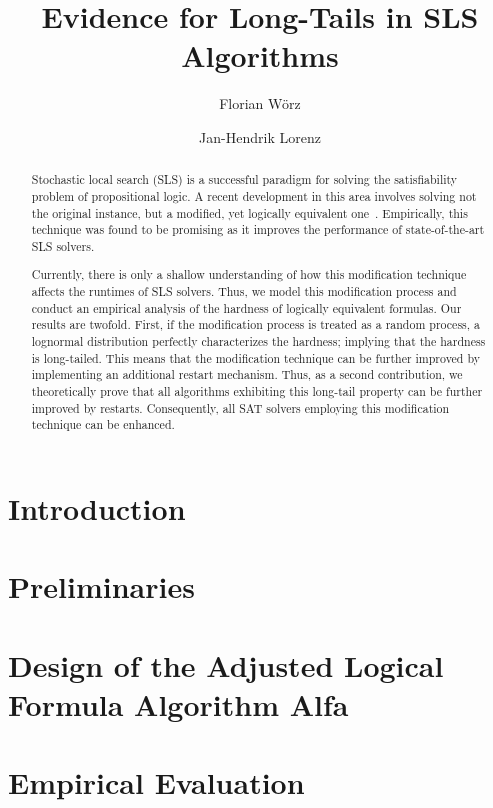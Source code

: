 \documentclass[a4paper,USenglish,cleveref, autoref, thm-restate, pdfa
]{lipics-v2021}
\title{Evidence for Long-Tails in SLS Algorithms} %
\author{Florian Wörz}{Universität Ulm, Institut für Theoretische Informatik, Ulm, Germany \and \url{https://www.uni-ulm.de/in/theo/m/woerz/} }{florian.woerz@uni-ulm.de}{https://orcid.org/0000-0003-2463-8167}{Supported by the Deutsche Forschungsgemeinschaft (DFG) under project number 430150230, ``Complexity measures for solving propositional formulas''.}%
\author{Jan-Hendrik Lorenz}{Universität Ulm, Institut für Theoretische Informatik, Ulm, Germany}{jan-hendrik.lorenz@uni-ulm.de}{https://orcid.org/0000-0002-9554-4347}{}
\begin{document}
\maketitle

\begin{abstract}
	Stochastic local search (SLS) is a successful paradigm for solving the satisfiability problem of propositional logic.  A recent development in this area involves solving not the original instance, but a modified, yet logically equivalent one~\cite{LW20OnTheEffectOfLearnedClauses}. Empirically, this technique was found to be promising as it improves the performance of state-of-the-art SLS solvers.
	
	Currently, there is only a shallow understanding of how this modification technique affects the runtimes of SLS solvers. Thus, we model this modification process and conduct an empirical analysis of the hardness of logically equivalent formulas. Our results are twofold. First, if the modification process is treated as a random process, a lognormal distribution perfectly characterizes the hardness; implying that the hardness is long-tailed.
	This means that the modification technique can be further improved by implementing an additional restart mechanism.
	Thus, as a second contribution, we theoretically prove that all algorithms exhibiting this long-tail property can be further improved by restarts. Consequently, all SAT solvers employing this modification technique can be enhanced.	
\end{abstract}



\section{Introduction}




\section{Preliminaries}




\section{Design of the Adjusted Logical Formula Algorithm Alfa}
\label{sec:DesignOfAlfa}




\section{Empirical Evaluation}
\end{document}
